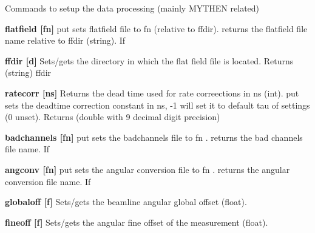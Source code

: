 Commands to setup the data processing (mainly MYTHEN related)


\begin{DoxyItemize}
\item {\bfseries flatfield \mbox{[}fn\mbox{]}} {\ttfamily put} sets flatfield file to {\ttfamily fn} (relative to {\ttfamily ffdir}).  returns the flatfield file name relative to {\ttfamily ffdir} (string). If
\end{DoxyItemize}


\begin{DoxyItemize}
\item {\bfseries ffdir \mbox{[}d\mbox{]}} Sets/gets the directory in which the flat field file is located. {\ttfamily Returns} {\ttfamily }(string) ffdir
\end{DoxyItemize}


\begin{DoxyItemize}
\item {\bfseries ratecorr \mbox{[}ns\mbox{]}} Returns the dead time used for rate correections in ns (int). {\ttfamily put} sets the deadtime correction constant in ns, -\/1 will set it to default tau of settings (0 unset). {\ttfamily Returns} {\ttfamily }(double with 9 decimal digit precision)
\end{DoxyItemize}


\begin{DoxyItemize}
\item {\bfseries badchannels \mbox{[}fn\mbox{]}} {\ttfamily put} sets the badchannels file to {\ttfamily fn} .  returns the bad channels file name. If
\end{DoxyItemize}


\begin{DoxyItemize}
\item {\bfseries angconv \mbox{[}fn\mbox{]}} {\ttfamily put} sets the angular conversion file to {\ttfamily fn} .  returns the angular conversion file name. If
\end{DoxyItemize}


\begin{DoxyItemize}
\item {\bfseries globaloff \mbox{[}f\mbox{]}} Sets/gets the beamline angular global offset (float).
\end{DoxyItemize}


\begin{DoxyItemize}
\item {\bfseries fineoff \mbox{[}f\mbox{]}} Sets/gets the angular fine offset of the measurement (float).
\end{DoxyItemize}


